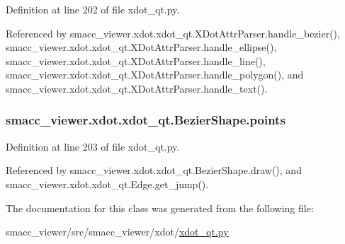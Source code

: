 Definition at line 202 of file xdot\+\_\+qt.\+py.



Referenced by smacc\+\_\+viewer.\+xdot.\+xdot\+\_\+qt.\+X\+Dot\+Attr\+Parser.\+handle\+\_\+bezier(), smacc\+\_\+viewer.\+xdot.\+xdot\+\_\+qt.\+X\+Dot\+Attr\+Parser.\+handle\+\_\+ellipse(), smacc\+\_\+viewer.\+xdot.\+xdot\+\_\+qt.\+X\+Dot\+Attr\+Parser.\+handle\+\_\+line(), smacc\+\_\+viewer.\+xdot.\+xdot\+\_\+qt.\+X\+Dot\+Attr\+Parser.\+handle\+\_\+polygon(), and smacc\+\_\+viewer.\+xdot.\+xdot\+\_\+qt.\+X\+Dot\+Attr\+Parser.\+handle\+\_\+text().

\subsubsection[{\texorpdfstring{points}{points}}]{\setlength{\rightskip}{0pt plus 5cm}smacc\+\_\+viewer.\+xdot.\+xdot\+\_\+qt.\+Bezier\+Shape.\+points}\hypertarget{classsmacc__viewer_1_1xdot_1_1xdot__qt_1_1BezierShape_a4f82fc0dc7fc27b2196829a68289ca37}{}\label{classsmacc__viewer_1_1xdot_1_1xdot__qt_1_1BezierShape_a4f82fc0dc7fc27b2196829a68289ca37}


Definition at line 203 of file xdot\+\_\+qt.\+py.



Referenced by smacc\+\_\+viewer.\+xdot.\+xdot\+\_\+qt.\+Bezier\+Shape.\+draw(), and smacc\+\_\+viewer.\+xdot.\+xdot\+\_\+qt.\+Edge.\+get\+\_\+jump().



The documentation for this class was generated from the following file\+:\begin{DoxyCompactItemize}
\item 
smacc\+\_\+viewer/src/smacc\+\_\+viewer/xdot/\hyperlink{xdot__qt_8py}{xdot\+\_\+qt.\+py}\end{DoxyCompactItemize}
